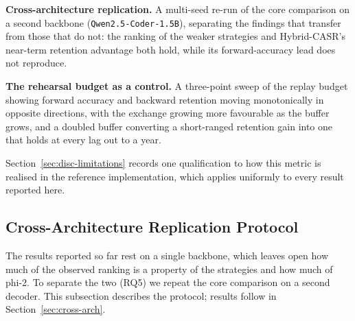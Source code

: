 
    \item \textbf{Cross-architecture replication.} A multi-seed re-run of the core comparison on a second backbone (\texttt{Qwen2.5-Coder-1.5B}), separating the findings that transfer from those that do not: the ranking of the weaker strategies and Hybrid-CASR's near-term retention advantage both hold, while its forward-accuracy lead does not reproduce.
    \item \textbf{The rehearsal budget as a control.} A three-point sweep of the replay budget showing forward accuracy and backward retention moving monotonically in opposite directions, with the exchange growing more favourable as the buffer grows, and a doubled buffer converting a short-ranged retention gain into one that holds at every lag out to a year.



Section~\ref{sec:disc-limitations} records one qualification to how this metric is realised in the reference implementation, which applies uniformly to every result reported here.



\subsection{Cross-Architecture Replication Protocol}
\label{sec:replication}

\noindent
The results reported so far rest on a single backbone, which leaves open how much of the observed ranking is a property of the strategies and how much of phi-2. To separate the two (RQ5) we repeat the core comparison on a second decoder. This subsection describes the protocol; results follow in Section~\ref{sec:cross-arch}.

